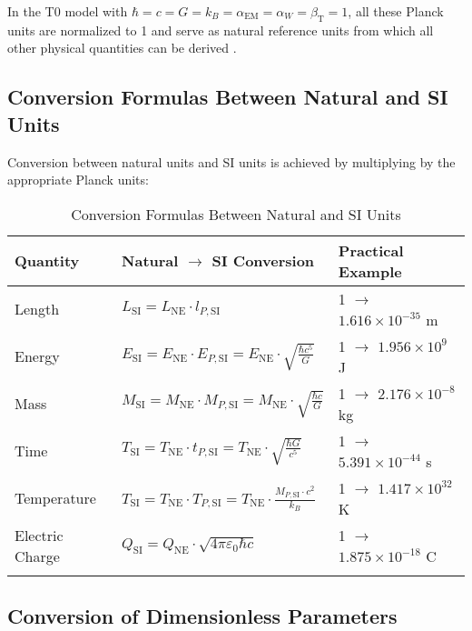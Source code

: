 \documentclass[12pt,a4paper]{article}
\newcommand{\alphaEM}{\alpha_{\text{EM}}}
\newcommand{\betaT}{\beta_{\text{T}}}
\begin{document}
	In the T0 model with $\hbar = c = G = k_B = \alphaEM = \alpha_W = \betaT = 1$, all these Planck units are normalized to 1 and serve as natural reference units from which all other physical quantities can be derived \cite{pascher_planck_2025}.
	
	\subsection{Conversion Formulas Between Natural and SI Units}
	
	Conversion between natural units and SI units is achieved by multiplying by the appropriate Planck units:
	
	\begin{table}[ht]
		\centering
		\begin{adjustbox}{scale=1}
			\begin{tabular}{lll}
				\hline
				\textbf{Quantity} & \textbf{Natural $\to$ SI Conversion} & \textbf{Practical Example} \\
				\hline
				Length & $L_{\text{SI}} = L_{\text{NE}} \cdot l_{P,\text{SI}}$ & 1 $\to$ $1.616 \times 10^{-35}$ m \\
				Energy & $E_{\text{SI}} = E_{\text{NE}} \cdot E_{P,\text{SI}} = E_{\text{NE}} \cdot \sqrt{\frac{\hbar c^5}{G}}$ & 1 $\to$ $1.956 \times 10^9$ J \\
				Mass & $M_{\text{SI}} = M_{\text{NE}} \cdot M_{P,\text{SI}} = M_{\text{NE}} \cdot \sqrt{\frac{\hbar c}{G}}$ & 1 $\to$ $2.176 \times 10^{-8}$ kg \\
				Time & $T_{\text{SI}} = T_{\text{NE}} \cdot t_{P,\text{SI}} = T_{\text{NE}} \cdot \sqrt{\frac{\hbar G}{c^5}}$ & 1 $\to$ $5.391 \times 10^{-44}$ s \\
				Temperature & $T_{\text{SI}} = T_{\text{NE}} \cdot T_{P,\text{SI}} = T_{\text{NE}} \cdot \frac{M_{P,\text{SI}}\cdot c^2}{k_B}$ & 1 $\to$ $1.417 \times 10^{32}$ K \\
				Electric Charge & $Q_{\text{SI}} = Q_{\text{NE}} \cdot \sqrt{4\pi\varepsilon_0\hbar c}$ & 1 $\to$ $1.875 \times 10^{-18}$ C \\
				\hline
				\multicolumn{2}{c}{} \\
				\hline
			\end{tabular}
		\end{adjustbox}
		\caption{Conversion Formulas Between Natural and SI Units}
		\label{tab:conversion}
	\end{table}
	
	\subsection{Conversion of Dimensionless Parameters}
	
\end{document}
